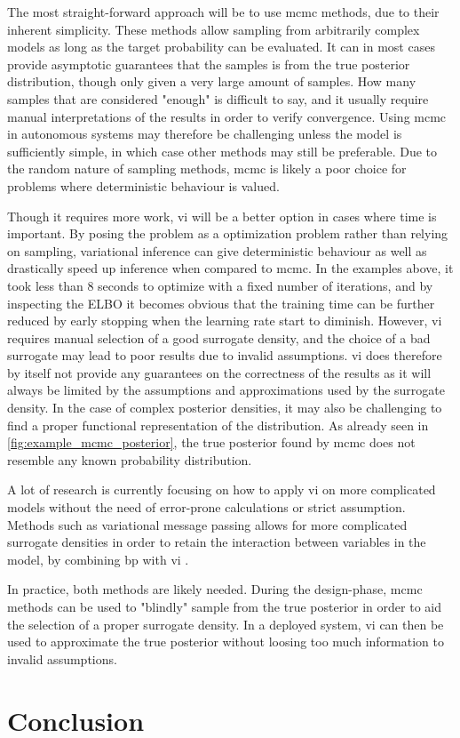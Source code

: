The most straight-forward approach will be to use \acrshort{mcmc} methods, due to their inherent simplicity. These methods allow sampling from arbitrarily complex models as long as the target probability can be evaluated. It can in most cases provide asymptotic guarantees that the samples is from the true posterior distribution, though only given a very large amount of samples. How many samples that are considered "enough" is difficult to say, and it usually require manual interpretations of the results in order to verify convergence. Using \acrshort{mcmc} in autonomous systems may therefore be challenging unless the model is sufficiently simple, in which case other methods may still be preferable. Due to the random nature of sampling methods, \acrshort{mcmc} is likely a poor choice for problems where deterministic behaviour is valued. 


Though it requires more work, \acrshort{vi} will be a better option in cases where time is important. By posing the problem as a optimization problem rather than relying on sampling, variational inference can give deterministic behaviour as well as drastically speed up inference when compared to \acrshort{mcmc}. In the examples above, it took less than $8$ seconds to optimize with a fixed number of iterations, and by inspecting the ELBO it becomes obvious that the training time can be further reduced by early stopping when the learning rate start to diminish. 
However, \acrshort{vi} requires manual selection of a good surrogate density, and the choice of a bad surrogate may lead to poor results due to invalid assumptions. \acrshort{vi} does therefore by itself not provide any guarantees on the correctness of the results as it will always be limited by the assumptions and approximations used by the surrogate density. In the case of complex posterior densities, it may also be challenging to find a proper functional representation of the distribution. As already seen in \cref{fig:example_mcmc_posterior}, the true posterior found by \acrshort{mcmc} does not resemble any known probability distribution. 

A lot of research is currently focusing on how to apply \acrshort{vi} on more complicated models without the need of error-prone calculations or strict assumption. Methods such as variational message passing allows for more complicated surrogate densities in order to retain the interaction between variables in the model, by combining \acrshort{bp} with \acrshort{vi} \cite{winnbishop}. 

In practice, both methods are likely needed. During the design-phase, \acrshort{mcmc} methods can be used to "blindly" sample from the true posterior in order to aid the selection of a proper surrogate density. In a deployed system, \acrshort{vi} can then be used to approximate the true posterior without loosing too much information to invalid assumptions. 

\section{Conclusion}

